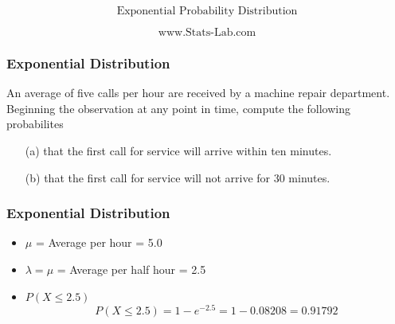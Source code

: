 \documentclass{beamer}
\begin{document}
\begin{frame}


\Large
\[ \mbox{Exponential Probability Distribution}  \]

\[ \mbox{www.Stats-Lab.com}\]


\end{frame}
\begin{frame}
\frametitle{Exponential Distribution}
\Large
An average of five calls per hour are received by a machine repair department. 
Beginning the observation at any point in time, compute the following probabilites

\begin{itemize} 
\item[(a)] that the first call 
for service will arrive within ten minutes.
\item[(b)] that the first call 
for service will not arrive for 30 minutes.
\end{itemize}
\end{frame}
\begin{frame}
\frametitle{Exponential Distribution}
\Large
\begin{itemize}
\item $\mu$ = Average per hour = 5.0
\item $\lambda= \mu$ = Average per half hour = 2.5
\item $P(X \leq 2.5) $
\[P(X \leq 2.5) = 1 - e^{-2.5} = 1 - 0.08208 = 0.91792\]
\end{itemize}
\end{frame}
\end{document}
